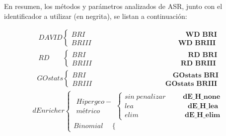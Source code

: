 \documentclass[12pt,twoside]{reedthesis}
\begin{document}
En resumen, los métodos y parámetros analizados de ASR, junto con el identificador a utilizar (en negrita), se listan a continuación:
\begin{small}
\[
\begin{matrix}
DAVID\left\{\begin{matrix}
       BRI\;\;\;\;\;\;\;\;\;\;\;\;\;\;\;\;\;\;\;\;\;\;\;\;\;\;\;\;\;\;\;\;\;\;\;\;\;\;\;\;\;\;\;\;\;\;\;\;\;\;\;\;\textbf{WD BRI}
    \\ BRIII\;\;\;\;\;\;\;\;\;\;\;\;\;\;\;\;\;\;\;\;\;\;\;\;\;\;\;\;\;\;\;\;\;\;\;\;\;\;\;\;\;\;\;\;\;\textbf{WD BRIII}
\end{matrix}\right.
\end{matrix}
\]
\[
\begin{matrix}
RD\;\;\;\;\;\;\; \left\{\begin{matrix}
       BRI\;\;\;\;\;\;\;\;\;\;\;\;\;\;\;\;\;\;\;\;\;\;\;\;\;\;\;\;\;\;\;\;\;\;\;\;\;\;\;\;\;\;\;\;\;\;\;\;\;\;\;\;\;\textbf{RD BRI}
    \\ BRIII\;\;\;\;\;\;\;\;\;\;\;\;\;\;\;\;\;\;\;\;\;\;\;\;\;\;\;\;\;\;\;\;\;\;\;\;\;\;\;\;\;\;\;\;\;\;\textbf{RD BRIII}
\end{matrix}\right.
\end{matrix}
\]
\[
\begin{matrix}
GOstats\left\{\begin{matrix}
       BRI\;\;\;\;\;\;\;\;\;\;\;\;\;\;\;\;\;\;\;\;\;\;\;\;\;\;\;\;\;\;\;\;\;\;\;\;\;\;\;\;\;\;\;\;\;\textbf{GOstats BRI}
    \\ BRIII\;\;\;\;\;\;\;\;\;\;\;\;\;\;\;\;\;\;\;\;\;\;\;\;\;\;\;\;\;\;\;\;\;\;\;\;\;\;\textbf{GOstats BRIII}
\end{matrix}\right.
\end{matrix}
\]
\[
\begin{matrix}
dEnricher \left\{\begin{matrix}
       \begin{matrix}Hipergeo-\\ métrico\end{matrix} \left\{\begin{matrix}
           sin\;penalizar\;\;\;\;\;\;\;\;\;\textbf{dE\_H\_none}
        \\ lea\;\;\;\;\;\;\;\;\;\;\;\;\;\;\;\;\;\;\;\;\;\;\;\;\;\;\;\;\textbf{dE\_H\_lea}
        \\ elim\;\;\;\;\;\;\;\;\;\;\;\;\;\;\;\;\;\;\;\;\;\;\;\;\textbf{dE\_H\_elim}
    \end{matrix}\right.
    \\ Binomial\;\;\;\; \left\{\begin{matrix}

\end{matrix}
\end{matrix}
\end{matrix}\]
\end{small}
\end{document}
